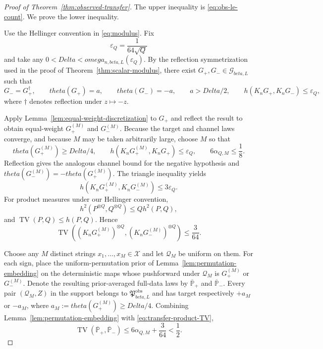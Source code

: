 \documentclass[11pt]{article}
\def\beta{beta}%
\def\theta{theta}%
\def\omega{omega}%
\def\Delta{Delta}%
\newcommand{\TV}{\operatorname{TV}}
\newcommand{\calQ}{\mathcal Q}
\newcommand{\calG}{\mathcal G}
\begin{document}
\begin{proof}[Proof of Theorem~\ref{thm:observed-transfer}]
The upper inequality is \eqref{eq:obs-le-count}.  We prove the lower inequality.

Use the Hellinger convention in \eqref{eq:modulus}.  Fix
\[
\varepsilon_Q=\frac{1}{64\sqrt Q}
\]
and take any $0<\Delta<\omega_{n,\beta,L}(\varepsilon_Q)$.  By the reflection symmetrization used in the proof of Theorem~\ref{thm:scalar-modulus}, there exist $G_+,G_-\in\calG_{\beta,L}$ such that
\begin{equation}
\label{eq:transfer-hard-pair}
G_-=G_+^\dagger,
\qquad
\theta(G_+)=a,
\qquad
\theta(G_-)=-a,
\qquad
a>\Delta/2,
\qquad
h(K_nG_+,K_nG_-)\le\varepsilon_Q,
\end{equation}
where $\dagger$ denotes reflection under $z\mapsto-z$.

Apply Lemma~\ref{lem:equal-weight-discretization} to $G_+$ and reflect the result to obtain equal-weight $G^{(M)}_+$ and $G^{(M)}_-$.  Because the target and channel laws converge, and because $M$ may be taken arbitrarily large, choose $M$ so that
\begin{equation}
\label{eq:transfer-M-choices}
\theta(G^{(M)}_+)\ge\Delta/4,
\qquad
h(K_nG^{(M)}_+,K_nG_+)\le\varepsilon_Q,
\qquad
6\alpha_{Q,M}\le\frac18.
\end{equation}
Reflection gives the analogous channel bound for the negative hypothesis and $\theta(G^{(M)}_-)=-\theta(G^{(M)}_+)$.  The triangle inequality yields
\[
h(K_nG^{(M)}_+,K_nG^{(M)}_-)
\le3\varepsilon_Q.
\]
For product measures under our Hellinger convention,
\[
h^2(P^{\otimes Q},Q^{\otimes Q})
\le
Qh^2(P,Q),
\]
and $\TV(P,Q)\le h(P,Q)$.  Hence
\begin{equation}
\label{eq:transfer-product-TV}
\TV\!\left(
(K_nG^{(M)}_+)^{\otimes Q},
(K_nG^{(M)}_-)^{\otimes Q}
\right)
\le
\frac{3}{64}.
\end{equation}

Choose any $M$ distinct strings $x_1,\dots,x_M\in\mathcal X$ and let $\calQ_M$ be uniform on them.  For each sign, place the uniform-permutation prior of Lemma~\ref{lem:permutation-embedding} on the deterministic maps whose pushforward under $\calQ_M$ is $G^{(M)}_+$ or $G^{(M)}_-$.  Denote the resulting prior-averaged full-data laws by $\overline{\mathbb P}_+$ and $\overline{\mathbb P}_-$.  Every pair $(\calQ_M,Z)$ in the support belongs to $\mathfrak P^{\mathrm{obs}}_{\beta,L}$ and has target respectively $+a_M$ or $-a_M$, where $a_M:=\theta(G^{(M)}_+)\ge\Delta/4$.  Combining Lemma~\ref{lem:permutation-embedding} with \eqref{eq:transfer-product-TV},
\[
\TV(\overline{\mathbb P}_+,\overline{\mathbb P}_-)
\le
6\alpha_{Q,M}+\frac{3}{64}
<\frac12.
\]


\end{proof}
\end{document}
